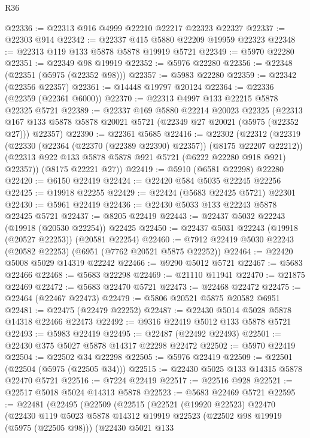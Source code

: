 \begin{lexlean}{R36}
\begin{coremodule}
@22336 := @22313 @916 @4999 @22210 @22217 @22323 @22327
@22337 := @22303 @914
@22342 := @22337 @415 @5880 @22209 @19959 @22323
@22348 := @22313 @119 @133 @5878 @5878 @19919 @5721
@22349 := @5970 @22280
@22351 := @22349 @98 @19919
@22352 := @5976 @22280
@22356 := @22348 (@22351 (@5975 (@22352 @98)))
@22357 := @5983 @22280
@22359 := @22342 (@22356 @22357)
@22361 := @14448 @19797 @20124
@22364 := @22336 (@22359 (@22361 @6000))
@22370 := @22313 @4997 @133 @22215 @5878 @22325 @5721
@22389 := @22337
    @169
    @5880
    @22214
    @20023
    @22325
    (@22313 @167 @133 @5878 @5878 @20021 @5721 (@22349 @27 @20021 (@5975 (@22352 @27))) @22357)
@22390 := @22361 @5685
@22416 := @22302
    (@22312
      (@22319
        (@22330 (@22364 (@22370 (@22389 @22390) @22357)) (@8175 @22207 @22212))
        (@22313 @922 @133 @5878 @5878 @921 @5721 (@6222 @22280 @918 @921) @22357))
      (@8175 @22221 @27))
@22419 := @5910 (@6581 @22298) @22280
@22420 := @6150 @22419
@22424 := @22420 @584 @5035 @22245 @22256
@22425 := @19918 @22255
@22429 := @22424 (@5683 @22425 @5721) @22301
@22430 := @5961 @22419
@22436 := @22430 @5033 @133 @22243 @5878 @22425 @5721
@22437 := @8205 @22419
@22443 := @22437 @5032 @22243 (@19918 (@20530 @22254)) @22425
@22450 := @22437 @5031 @22243 (@19918 (@20527 @22253)) (@20581 @22254)
@22460 := @7912 @22419 @5030 @22243 (@20582 @22253) (@6951 (@7762 @20521 @5875 @22252))
@22464 := @22420 @5008 @5029 @14319 @22242
@22466 := @9290 @5012 @5721
@22467 := @5683 @22466
@22468 := @5683 @22298
@22469 := @21110 @11941
@22470 := @21875 @22469
@22472 := @5683 @22470 @5721
@22473 := @22468 @22472
@22475 := @22464 (@22467 @22473)
@22479 := @5806 @20521 @5875 @20582 @6951
@22481 := @22475 (@22479 @22252)
@22487 := @22430 @5014 @5028 @5878 @14318 @22466 @22473
@22492 := @9316 @22419 @5012 @133 @5878 @5721
@22493 := @5983 @22419
@22495 := @22487 (@22492 @22493)
@22501 := @22430 @375 @5027 @5878 @14317 @22298 @22472
@22502 := @5970 @22419
@22504 := @22502 @34 @22298
@22505 := @5976 @22419
@22509 := @22501 (@22504 (@5975 (@22505 @34)))
@22515 := @22430 @5025 @133 @14315 @5878 @22470 @5721
@22516 := @7224 @22419
@22517 := @22516 @928
@22521 := @22517 @5018 @5024 @14313 @5878
@22523 := @5683 @22469 @5721
@22595 := @22481
    (@22495
      (@22509
        (@22515
          (@22521
            (@19920 @22523)
            @22470
            (@22430
              @119
              @5023
              @5878
              @14312
              @19919
              @22523
              (@22502 @98 @19919 (@5975 (@22505 @98)))
              (@22430
                @5021
                @133

\end{coremodule}
\end{lexlean}

